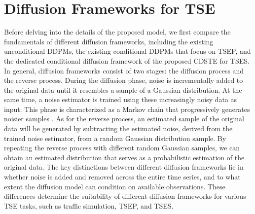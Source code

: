 \documentclass[a4paper,fleqn,12pt]{cas-sc}
\begin{document}
\section{Diffusion Frameworks for TSE}\label{sec:Diff}
Before delving into the details of the proposed model, we first compare the fundamentals of different diffusion frameworks, including the existing unconditional DDPMs, the existing conditional DDPMs that focus on TSEP, and the dedicated conditional diffusion framework of the proposed CDSTE for TSES. In general, diffusion frameworks consist of two stages: the diffusion process and the reverse process. During the diffusion phase, noise is incrementally added to the original data until it resembles a sample of a Gaussian distribution. At the same time, a noise estimator is trained using these increasingly noisy data as input. This phase is characterized as a Markov chain that progressively generates noisier samples \citep{ho2020denoising}. As for the reverse process, an estimated sample of the original data will be generated by subtracting the estimated noise, derived from the trained noise estimator, from a random Gaussian distribution sample. By repeating the reverse process with different random Gaussian samples, we can obtain an estimated distribution that serves as a probabilistic estimation of the original data. The key distinctions between different diffusion frameworks lie in whether noise is added and removed across the entire time series, and to what extent the diffusion model can condition on available observations. These differences determine the suitability of different diffusion frameworks for various TSE tasks, such as traffic simulation, TSEP, and TSES.
\end{document}
